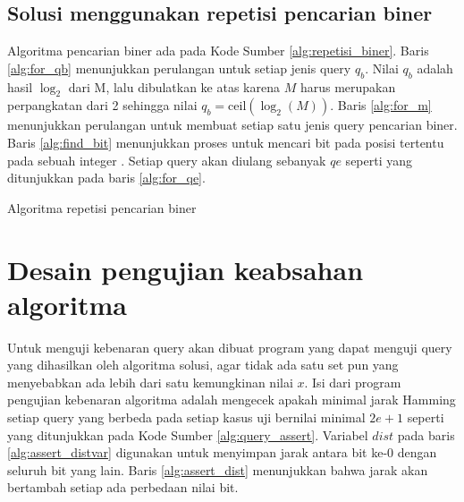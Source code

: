 \subsection{Solusi menggunakan repetisi pencarian biner}

Algoritma pencarian biner ada pada Kode Sumber \ref{alg:repetisi_biner}. Baris \ref{alg:for_qb} menunjukkan perulangan untuk setiap jenis query $q_b$. Nilai $q_b$ adalah hasil $\log_2$ dari M, lalu dibulatkan ke atas karena $M$ harus merupakan perpangkatan dari 2 sehingga nilai $q_b = \text{ceil}(\log_2(M))$. Baris \ref{alg:for_m} menunjukkan perulangan untuk membuat setiap satu jenis query pencarian biner. Baris \ref{alg:find_bit} menunjukkan proses untuk mencari bit pada posisi tertentu pada sebuah integer \cite{bithack}. Setiap query akan diulang sebanyak $qe$ seperti yang ditunjukkan pada baris \ref{alg:for_qe}.

\begin{algorithm}[h]
\caption{Algoritma repetisi pencarian biner}
\label{alg:repetisi_biner}
\end{algorithm}


\section{Desain pengujian keabsahan algoritma}

Untuk menguji kebenaran query akan dibuat program yang dapat menguji query yang dihasilkan oleh algoritma solusi, agar tidak ada satu set pun yang menyebabkan ada lebih dari satu kemungkinan nilai $x$. Isi dari program pengujian kebenaran algoritma adalah mengecek apakah minimal jarak Hamming setiap query yang berbeda pada setiap kasus uji bernilai minimal $2e+1$ seperti yang ditunjukkan pada Kode Sumber \ref{alg:query_assert}. Variabel $dist$ pada baris \ref{alg:assert_distvar} digunakan untuk menyimpan jarak antara bit ke-0 dengan seluruh bit yang lain. Baris \ref{alg:assert_dist} menunjukkan bahwa jarak akan bertambah setiap ada perbedaan nilai bit.

